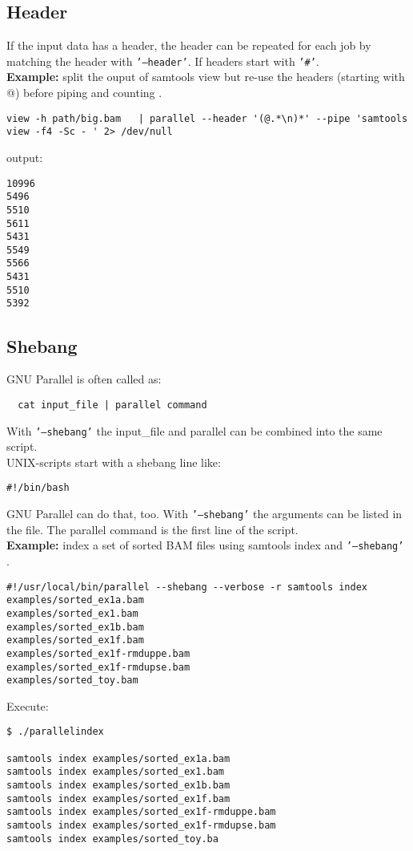\documentclass{article}
\newcommand{\example}[1]{
\textbf{Example: } {\color[rgb]{0,0,1} #1 } .
}
\newcommand{\cmdoption}[1]{\texttt{'#1'}}
\begin{document}
\subsection{Header}
If the input data has a header, the header can be repeated for each job by matching the header with \cmdoption{--header}. If headers start with \cmdoption{\#}.\\
\example{split the ouput of samtools view but re-use the headers (starting with @) before piping and counting}
\begin{lstlisting}
view -h path/big.bam   | parallel --header '(@.*\n)*' --pipe 'samtools view -f4 -Sc - ' 2> /dev/null 
\end{lstlisting}
output:
\begin{lstlisting}
10996
5496
5510
5611
5431
5549
5566
5431
5510
5392
\end{lstlisting}

\subsection{Shebang}
GNU Parallel is often called as:
\begin{lstlisting}
  cat input_file | parallel command
\end{lstlisting}
With \cmdoption{--shebang} the input\_file and parallel can be combined into the same script.\\
UNIX-scripts start with a shebang line like:
\begin{lstlisting}
#!/bin/bash
\end{lstlisting}

GNU Parallel can do that, too. With \cmdoption{--shebang} the arguments can be listed in the file. The parallel command is the first line of the script.\\
\example{index a set of sorted BAM files using samtools index and  \cmdoption{--shebang}}
\begin{lstlisting}
#!/usr/local/bin/parallel --shebang --verbose -r samtools index
examples/sorted_ex1a.bam
examples/sorted_ex1.bam
examples/sorted_ex1b.bam
examples/sorted_ex1f.bam
examples/sorted_ex1f-rmduppe.bam
examples/sorted_ex1f-rmdupse.bam
examples/sorted_toy.bam
\end{lstlisting}

Execute:
\begin{lstlisting}
$ ./parallelindex

samtools index examples/sorted_ex1a.bam
samtools index examples/sorted_ex1.bam
samtools index examples/sorted_ex1b.bam
samtools index examples/sorted_ex1f.bam
samtools index examples/sorted_ex1f-rmduppe.bam
samtools index examples/sorted_ex1f-rmdupse.bam
samtools index examples/sorted_toy.ba
\end{lstlisting}
\end{document}
